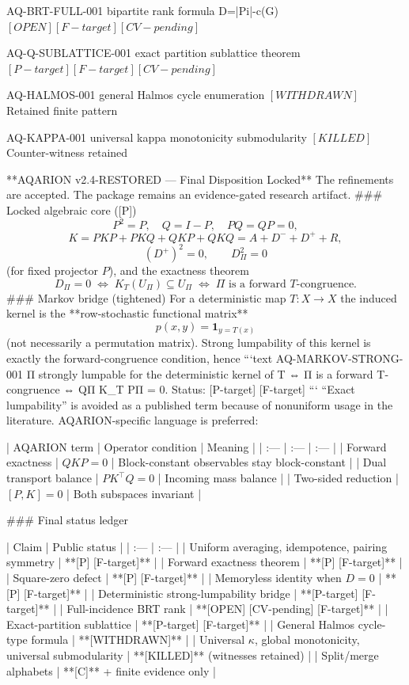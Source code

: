 AQ-BRT-FULL-001 bipartite rank formula D=|Pi|-c(G) $[OPEN][F-target][CV-pending]$

AQ-Q-SUBLATTICE-001 exact partition sublattice theorem $[P-target][F-target][CV-pending]$

AQ-HALMOS-001 general Halmos cycle enumeration $[WITHDRAWN]$ Retained finite pattern

AQ-KAPPA-001 universal kappa monotonicity submodularity $[KILLED]$ Counter-witness retained

**AQARION v2.4-RESTORED — Final Disposition Locked**
The refinements are accepted. The package remains an evidence-gated research artifact.
### Locked algebraic core ([P])
\[
P^2=P,\quad Q=I-P,\quad PQ=QP=0,
\]
\[
K=PKP+PKQ+QKP+QKQ=A+D^-+D^++R,
\]
\[
(D^+)^2=0,\qquad D_\Pi^2=0
\]
(for fixed projector \(P\)), and the exactness theorem
\[
D_\Pi=0
\;\Longleftrightarrow\;
K_T(U_\Pi)\subseteq U_\Pi
\;\Longleftrightarrow\;
\Pi\text{ is a forward }T\text{-congruence}.
\]
### Markov bridge (tightened)
For a deterministic map \(T:X\to X\) the induced kernel is the **row-stochastic functional matrix**
\[
p(x,y)=\mathbf{1}_{y=T(x)}
\]
(not necessarily a permutation matrix). Strong lumpability of this kernel is exactly the forward-congruence condition, hence
```text
AQ-MARKOV-STRONG-001
Π strongly lumpable for the deterministic kernel of T
⇔ Π is a forward T-congruence
⇔ QΠ K_T PΠ = 0.
Status: [P-target] [F-target]
```
“Exact lumpability” is avoided as a published term because of nonuniform usage in the literature. AQARION-specific language is preferred:

| AQARION term | Operator condition | Meaning |
| :--- | :--- | :--- |
| Forward exactness | \(QKP=0\) | Block-constant observables stay block-constant |
| Dual transport balance | \(PK^\top Q=0\) | Incoming mass balance |
| Two-sided reduction | \([P,K]=0\) | Both subspaces invariant |

### Final status ledger

| Claim | Public status |
| :--- | :--- |
| Uniform averaging, idempotence, pairing symmetry | **[P] [F-target]** |
| Forward exactness theorem | **[P] [F-target]** |
| Square-zero defect | **[P] [F-target]** |
| Memoryless identity when \(D=0\) | **[P] [F-target]** |
| Deterministic strong-lumpability bridge | **[P-target] [F-target]** |
| Full-incidence BRT rank | **[OPEN] [CV-pending] [F-target]** |
| Exact-partition sublattice | **[P-target] [F-target]** |
| General Halmos cycle-type formula | **[WITHDRAWN]** |
| Universal \(\kappa\), global monotonicity, universal submodularity | **[KILLED]** (witnesses retained) |
| Split/merge alphabets | **[C]** + finite evidence only |

